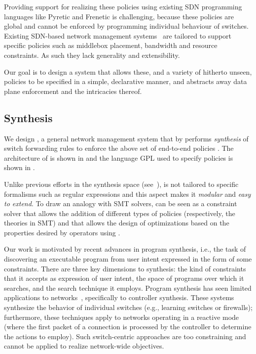 Providing support for realizing these policies using existing SDN
programming languages like Pyretic and Frenetic is challenging,
because these policies are global and cannot be enforced by
programming individual behaviour of switches. Existing SDN-based
network management systems~\cite{simple,merlin,oneswitch} are tailored
to support specific policies such as middlebox placement, bandwidth
and resource constraints. As such they lack generality and
extensibility.

Our goal is to design a system that allows these, and a variety of
hitherto unseen, policies to be specified in a simple, declarative
manner, and abstracts away data plane enforcement and the intricacies
thereof.
  
\subsection{Synthesis} \label{sec:synthesis} 



We design \name, a general network management system that 
by performs {\em synthesis} of switch forwarding
rules to enforce the above set of end-to-end policies . The architecture of \name
is shown in  and the 
language GPL used to specify policies
is shown in .

Unlike previous efforts in the synthesis space (see~\cite{netgen,merlin}), \Name is
not tailored to specific formalisms such as regular expressions and
this aspect makes it {\em modular} and {\em easy to extend}.
To draw an analogy with SMT solvers, \Name can be seen as a constraint
solver that allows the addition of different types of policies
(respectively, the theories in SMT) and that allows the design of
optimizations based on the properties desired by 
  operators using \Name. 
  
  Our work is motivated by recent advances in program synthesis, i.e.,
  the task of discovering an executable program from user intent
  expressed in the form of some constraints. There are three key
  dimensions to synthesis: the kind of constraints that it accepts as
  expression of user intent, the space of programs over which it
  searches, and the search technique it employs. Program synthesis has
  seen limited applications to networks~\cite{netegg,decentralize},
  specifically to controller synthesis. These systems synthesize the
  behavior of individual switches (e.g., learning switches or
  firewalls); furthermore, these techniques apply to networks
  operating in a reactive mode (where the first packet of a connection
  is processed by the controller to determine the actions to
  employ). Such switch-centric approaches are too constraining and
  cannot be applied to realize network-wide objectives.

